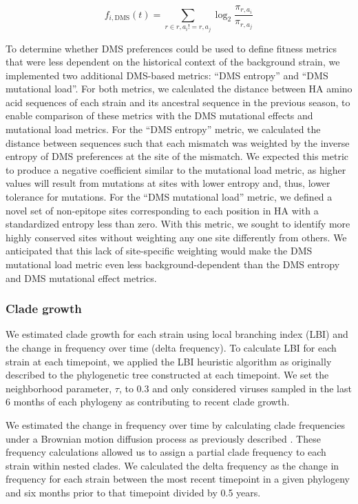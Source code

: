 \begin{equation}
    f_{i,\mathrm{DMS}}(t) = \sum_{r \in r,a_{i} != r,a_{j}}\log_{2}\frac{\pi_{r,a_{i}}}{\pi_{r,a_{j}}}
    \label{equation_mutational_preference}
\end{equation}

To determine whether DMS preferences could be used to define fitness metrics that were less dependent on the historical context of the background strain, we implemented two additional DMS-based metrics: ``DMS entropy'' and ``DMS mutational load''.
For both metrics, we calculated the distance between HA amino acid sequences of each strain and its ancestral sequence in the previous season, to enable comparison of these metrics with the DMS mutational effects and mutational load metrics.
For the ``DMS entropy'' metric, we calculated the distance between sequences such that each mismatch was weighted by the inverse entropy of DMS preferences at the site of the mismatch.
We expected this metric to produce a negative coefficient similar to the mutational load metric, as higher values will result from mutations at sites with lower entropy and, thus, lower tolerance for mutations.
For the ``DMS mutational load'' metric, we defined a novel set of non-epitope sites corresponding to each position in HA with a standardized entropy less than zero.
With this metric, we sought to identify more highly conserved sites without weighting any one site differently from others.
We anticipated that this lack of site-specific weighting would make the DMS mutational load metric even less background-dependent than the DMS entropy and DMS mutational effect metrics.

\subsubsection{Clade growth}

We estimated clade growth for each strain using local branching index (LBI) and the change in frequency over time (delta frequency).
To calculate LBI for each strain at each timepoint, we applied the LBI heuristic algorithm as originally described \citep{Neher:2014eu} to the phylogenetic tree constructed at each timepoint.
We set the neighborhood parameter, $\tau$, to 0.3 and only considered viruses sampled in the last 6 months of each phylogeny as contributing to recent clade growth.

We estimated the change in frequency over time by calculating clade frequencies under a Brownian motion diffusion process as previously described \citep{Lee2018}.
These frequency calculations allowed us to assign a partial clade frequency to each strain within nested clades.
We calculated the delta frequency as the change in frequency for each strain between the most recent timepoint in a given phylogeny and six months prior to that timepoint divided by 0.5 years.

